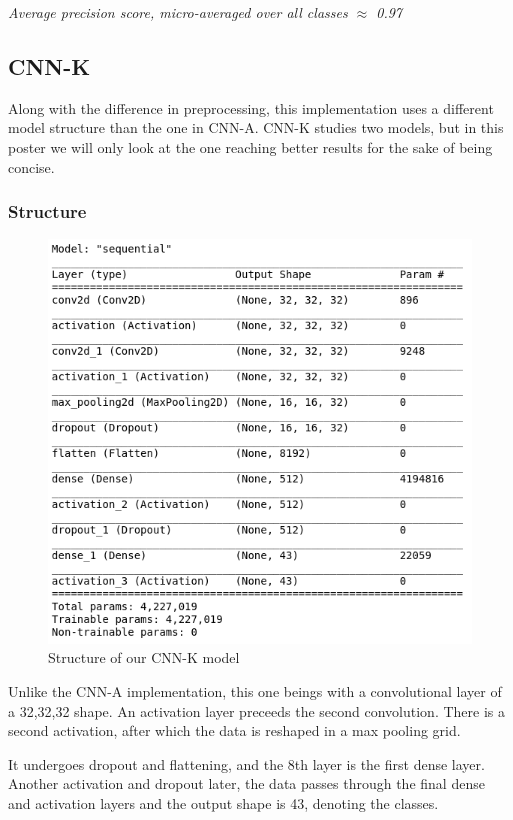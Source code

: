 \documentclass[12pt, landscape]{article}
\begin{document}
\begin{multicols}{3}
\begin{center}
\emph{Average precision score, micro-averaged over all classes $\approx$ 0.97}
\end{center}


\subsection{CNN-K}
Along with the difference in preprocessing, this implementation uses a different
model structure than the one in CNN-A. CNN-K studies two models, but in this
poster we will only look at the one reaching better results for the sake of
being concise.

\subsubsection{Structure}
\begin{figure}[H]
    \centerline{\includegraphics[scale = 0.5]{figuremodel1.png}}
    \caption{Structure of our CNN-K model}
    \label{fig:CNNKstructure}
\end{figure}
Unlike the CNN-A implementation, this one beings with a convolutional layer of a
32,32,32 shape. An activation layer preceeds the second convolution. There is a
second activation, after which the data is reshaped in a max pooling grid.

It undergoes dropout and flattening, and the 8th layer is the first dense layer.
Another activation and dropout later, the data passes through the final dense
and activation layers and the output shape is 43, denoting the classes.


\end{multicols}
\end{document}
